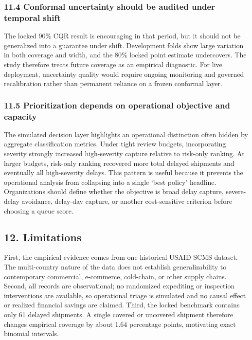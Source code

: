 \documentclass[
]{article}
\begin{document}
\subsubsection{11.4 Conformal uncertainty should be audited under
temporal
shift}\label{conformal-uncertainty-should-be-audited-under-temporal-shift}

The locked 90\% CQR result is encouraging in that period, but it should
not be generalized into a guarantee under shift. Development folds show
large variation in both coverage and width, and the 80\% locked point
estimate undercovers. The study therefore treats future coverage as an
empirical diagnostic. For live deployment, uncertainty quality would
require ongoing monitoring and governed recalibration rather than
permanent reliance on a frozen conformal layer.

\subsubsection{11.5 Prioritization depends on operational objective and
capacity}\label{prioritization-depends-on-operational-objective-and-capacity}

The simulated decision layer highlights an operational distinction often
hidden by aggregate classification metrics. Under tight review budgets,
incorporating severity strongly increased high-severity capture relative
to risk-only ranking. At larger budgets, risk-only ranking recovered
more total delayed shipments and eventually all high-severity delays.
This pattern is useful because it prevents the operational analysis from
collapsing into a single `best policy' headline. Organizations should
define whether the objective is broad delay capture, severe-delay
avoidance, delay-day capture, or another cost-sensitive criterion before
choosing a queue score.

\subsection{12. Limitations}\label{limitations}

First, the empirical evidence comes from one historical USAID SCMS
dataset. The multi-country nature of the data does not establish
generalizability to contemporary commercial, e-commerce, cold-chain, or
other supply chains. Second, all records are observational; no
randomized expediting or inspection interventions are available, so
operational triage is simulated and no causal effect or realized
financial savings are claimed. Third, the locked benchmark contains only
61 delayed shipments. A single covered or uncovered shipment therefore
changes empirical coverage by about 1.64 percentage points, motivating
exact binomial intervals.
\end{document}
